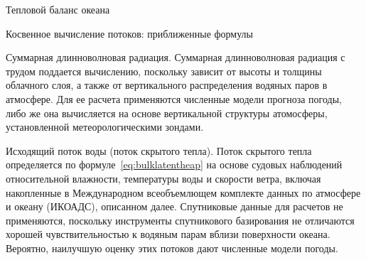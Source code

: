 \begin{chapter}{Тепловой баланс океана}
\begin{section}{Косвенное вычисление потоков: приближенные формулы}
\begin{paragraph}{Суммарная длинноволновая радиация.}
Суммарная длинноволновая радиация с трудом поддается вычислению, поскольку
зависит от высоты и толщины облачного слоя, а также от вертикального 
распределения водяных паров в атмосфере. Для ее расчета применяются численные
модели прогноза погоды, либо же она вычисляется на основе вертикальной
структуры атомосферы, установленной метеорологическими зондами.
%
\end{paragraph}

\begin{paragraph}{Исходящий поток воды (поток скрытого тепла).}
Поток скрытого тепла определяется по формуле~\ref{eq:bulklatentheap} 
на основе судовых наблюдений относительной влажности,
температуры воды и скорости ветра, включая накопленные
в Международном всеобъемлющем комплекте данных по атмосфере 
и океану (ИКОАДС), описанном далее. Спутниковые данные для расчетов 
не применяются, поскольку инструменты спутникового базирования не отличаются
хорошей чувствительностью к водяным парам вблизи поверхности океана. Вероятно,
наилучшую оценку этих потоков дают численные модели погоды.
%
\end{paragraph}


\end{section}
\end{chapter}
